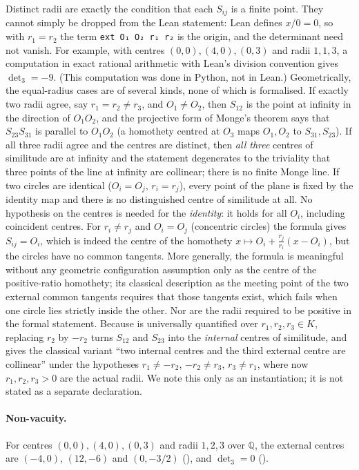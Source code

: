 \documentclass[11pt]{article}
\theoremstyle{definition}
\theoremstyle{remark}
\newcommand{\lean}[1]{\texttt{#1}}
\newcommand{\QQ}{\mathbb{Q}}
\begin{document}
Distinct radii are exactly the condition that each $S_{ij}$ is a finite
point. They cannot simply be dropped from the Lean statement: Lean defines $x/0=0$, so with
$r_1=r_2$ the term \lean{ext O₁ O₂ r₁ r₂} is the origin, and the determinant need not vanish. For
example, with centres $(0,0),(4,0),(0,3)$ and radii $1,1,3$, a computation in exact rational
arithmetic with Lean's division convention gives $\det_3=-9$. (This computation was done in Python,
not in Lean.) Geometrically, the equal-radius cases are of several kinds, none of which is
formalised. If exactly two radii agree, say $r_1=r_2\ne r_3$, and $O_1\ne O_2$, then $S_{12}$ is
the point at infinity in the direction of $O_1O_2$, and the projective form of Monge's theorem
says that $S_{23}S_{31}$ is parallel to $O_1O_2$ (a homothety centred at $O_3$ maps $O_1,O_2$ to
$S_{31},S_{23}$). If all three radii agree and the centres are distinct, then \emph{all three}
centres of similitude are at infinity and the statement degenerates to the triviality that three
points of the line at infinity are collinear; there is no finite Monge line. If two circles are
identical ($O_i=O_j$, $r_i=r_j$), every point of the plane is fixed by the identity map and there
is no distinguished centre of similitude at all. No hypothesis on the centres is needed for the
\emph{identity}: it holds for all $O_i$, including coincident centres. For $r_i\ne r_j$ and
$O_i=O_j$ (concentric circles) the formula gives $S_{ij}=O_i$, which is indeed the centre of the
homothety $x\mapsto O_i+\tfrac{r_j}{r_i}(x-O_i)$, but the circles have no common tangents.
More generally, the formula is meaningful without any geometric configuration assumption only as
the centre of the positive-ratio homothety; its classical description as the meeting point of the
two external common tangents requires that those tangents exist, which fails when one circle
lies strictly inside the other.
Nor are the radii required to be positive in the formal statement. Because  is universally quantified
over $r_1,r_2,r_3\in K$, replacing $r_2$ by $-r_2$ turns $S_{12}$ and $S_{23}$ into the
\emph{internal} centres of similitude, and gives the classical variant ``two internal centres and
the third external centre are collinear'' under the hypotheses $r_1\ne-r_2$, $-r_2\ne r_3$,
$r_3\ne r_1$, where now $r_1,r_2,r_3>0$ are the actual radii. We note this only as an instantiation; it is not stated as a separate declaration.

\paragraph{Non-vacuity.} For centres $(0,0),(4,0),(0,3)$ and radii $1,2,3$ over $\QQ$, the
external centres are $(-4,0)$, $(12,-6)$ and $(0,-3/2)$ (), and
$\det_3=0$ ().
\end{document}

